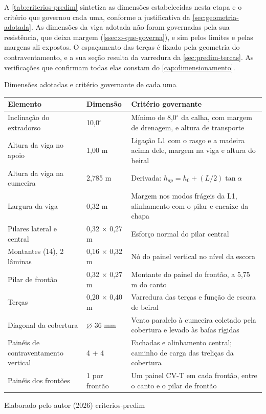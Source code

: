 A \autoref{tab:criterios-predim} sintetiza as dimensões estabelecidas nesta
etapa e o critério que governou cada uma, conforme a justificativa da
\autoref{sec:geometria-adotada}. As dimensões da viga adotada não foram
governadas pela sua resistência, que deixa margem
(\autoref{ssec:o-que-governa}), e sim pelos limites e pelas margens ali
expostos. O espaçamento das terças é fixado pela
geometria do contraventamento, e a sua seção resulta da varredura da
\autoref{sec:predim-tercas}. As verificações que confirmam todas elas constam do
\autoref{cap:dimensionamento}.

\tabela
{Dimensões adotadas e critério governante de cada uma}
{\footnotesize
\begin{tabular}{llp{5.8cm}}
\toprule
    \textbf{Elemento} & \textbf{Dimensão} & \textbf{Critério governante} \\
\midrule
    Inclinação do extradorso & 10,0$^{\circ}$ & Mínimo de 8,0$^{\circ}$ da calha, com margem de drenagem, e altura de transporte \\
    Altura da viga no apoio & 1,00 m & Ligação L1 com o rasgo e a madeira acima dele, margem na viga e altura do beiral \\
    Altura da viga na cumeeira & 2,785 m & Derivada: $h_{ap} = h_0 + (L/2)\tan\alpha$ \\
    Largura da viga & 0,32 m & Margem nos modos frágeis da L1, alinhamento com o pilar e encaixe da chapa \\
    Pilares lateral e central & 0,32 $\times$ 0,27 m & Esforço normal do pilar central \\
    Montantes (14), 2 lâminas & 0,16 $\times$ 0,32 m & Nó do painel vertical no nível da escora \\
    Pilar de frontão & 0,32 $\times$ 0,27 m & Montante do painel do frontão, a 5,75 m do canto \\
    Terças & 0,20 $\times$ 0,40 m & Varredura das terças e função de escora de beiral \\
    Diagonal da cobertura & $\varnothing$ 36 mm & Vento paralelo à cumeeira coletado pela cobertura e levado às baías rígidas \\
    Painéis de contraventamento vertical & 4 + 4 & Fachadas e alinhamento central; caminho de carga das treliças da cobertura \\
    Painéis dos frontões & 1 por frontão & Um painel CV-T em cada frontão, entre o canto e o pilar de frontão \\
\bottomrule
\end{tabular}}
{Elaborado pelo autor (2026)}
{criterios-predim}
{}
{}
